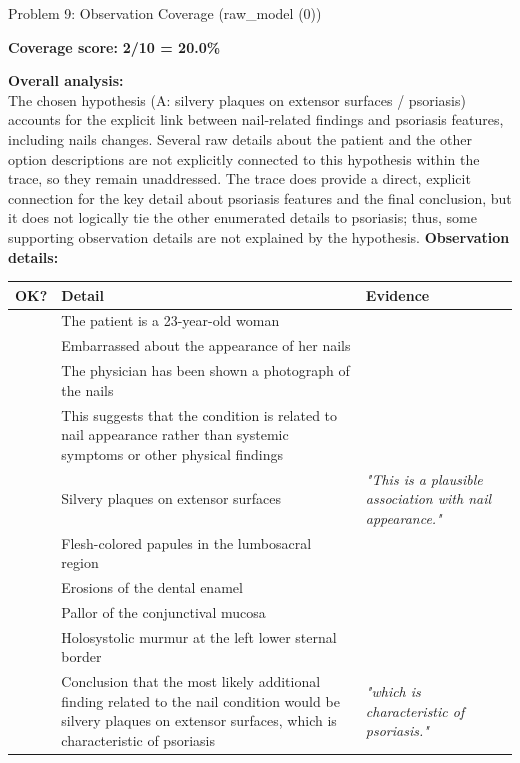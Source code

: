 \documentclass{beamer}
\newcommand{\cmark}{\textcolor{green!60!black}{\ding{51}}}
\newcommand{\xmark}{\textcolor{red}{\ding{55}}}
\begin{document}
\begin{frame}[allowframebreaks]{Problem 9: Observation Coverage (raw\_model (0))}
    \begin{center}
    \textbf{Coverage score: } {\Large\textbf{2/10 = 20.0\%}}
    \end{center}
    \vspace{4pt}
    \textbf{Overall analysis:}\\[4pt]
    \small The chosen hypothesis (A: silvery plaques on extensor surfaces / psoriasis) accounts
for the explicit link between nail-related findings and psoriasis features, including
nails changes. Several raw details about the patient and the other option
descriptions are not explicitly connected to this hypothesis within the trace, so
they remain unaddressed. The trace does provide a direct, explicit connection for the
key detail about psoriasis features and the final conclusion, but it does not
logically tie the other enumerated details to psoriasis; thus, some supporting
observation details are not explained by the hypothesis.
    \vspace{8pt}
    \textbf{Observation details:}\\[4pt]
    \begin{tabularx}{\textwidth}{>{\centering\arraybackslash}p{0.9cm} X p{4.5cm}}
    \toprule
    \textbf{OK?} & \textbf{Detail} & \textbf{Evidence} \\
    \midrule
      \xmark & \small The patient is a 23-year-old woman & \small\itshape  \\
      \xmark & \small Embarrassed about the appearance of her nails & \small\itshape  \\
      \xmark & \small The physician has been shown a photograph of the nails & \small\itshape  \\
      \xmark & \small This suggests that the condition is related to nail
appearance rather than systemic symptoms or other physical
findings & \small\itshape  \\
      \cmark & \small Silvery plaques on extensor surfaces & \small\itshape "This is a plausible association with
nail appearance." \\
      \xmark & \small Flesh-colored papules in the lumbosacral region & \small\itshape  \\
      \xmark & \small Erosions of the dental enamel & \small\itshape  \\
      \xmark & \small Pallor of the conjunctival mucosa & \small\itshape  \\
      \xmark & \small Holosystolic murmur at the left lower sternal border & \small\itshape  \\
      \cmark & \small Conclusion that the most likely additional finding related
to the nail condition would be silvery plaques on extensor
surfaces, which is characteristic of psoriasis & \small\itshape "which is characteristic of psoriasis." \\
    \bottomrule
    \end{tabularx}
\end{frame}
\end{document}
